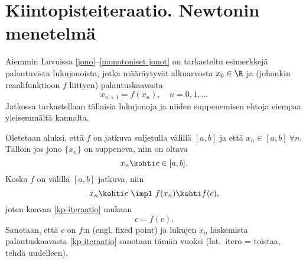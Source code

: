 \section{Kiintopisteiteraatio. Newtonin menetelmä} \label{kiintopisteiteraatio}
\alku
{}

Aiemmin Luvuissa \ref{jono}--\ref{monotoniset jonot} on tarkasteltu esimerkkejä palautuvista
lukujonoista, jotka määräytyvät alkuarvosta $x_0\in\R$ ja (johonkin reaalifunktioon $f$
liittyen) palautuskaavasta
\begin{equation} \label{kp-iteraatio}
x_{n+1}=f(x_n),\quad n=0,1,\ldots \tag{$\star$}
\end{equation}
Jatkossa tarkastellaan tällaisia lukujonoja ja niiden suppenemisen ehtoja eiempaa yleisemmältä
kannalta.

Oletetaan aluksi, että $f$ on jatkuva suljetulla välillä $[a,b]$ ja että 
$x_n\in [a,b]\ \forall n$. Tällöin jos jono $\{x_n\}$ on suppeneva, niin on oltava 
\[
x_n\kohti c\in [a,b].
\]
Koska $f$ on välillä $[a,b]$ jatkuva, niin
\[
x_n\kohti c \ \impl \ f(x_n)\kohti f(c),
\]
joten kaavan \eqref{kp-iteraatio} mukaan
\[
c=f(c).
\]
Sanotaan, että $c$ on $f$:n
%
 (engl. fixed point) ja lukujen $x_n$ laskemista 
palautuskaavasta \eqref{kp-iteraatio} sanotaan tämän vuoksi  
(lat.\ itero = toistaa, tehdä uudelleen).

